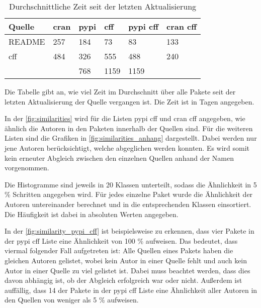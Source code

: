 \begin{table}
    \begin{tabularx}{\textwidth}{XR{1.3cm}R{1.3cm}R{1.3cm}R{2.4cm}R{2.6cm}}
        \toprule
        \textbf{Quelle} & \textbf{\gls{cran}} & \textbf{\gls{pypi}} & \textbf{\gls{cff}} & \textbf{\gls{pypi} \gls{cff}} & \textbf{\gls{cran} \gls{cff}} \\ 
        \midrule
        README          & 257 & 184 & 73   & 83   & 133 \\
        \gls{cff}       & 484 & 326 & 555  & 488  & 240 \\
         &     & 768 & 1159 & 1159 &     \\
        \bottomrule
    \end{tabularx}
    \caption{Durchschnittliche Zeit seit der letzten Aktualisierung}
    \label{tab:average_time_last_update}
    \small
    Die Tabelle gibt an, wie viel Zeit im Durchschnitt über alle Pakete seit der letzten Aktualisierung der Quelle vergangen ist. Die Zeit ist in Tagen angegeben.
\end{table}

In der \autoref{fig:similarities} wird für die Listen \gls{pypi} \gls{cff} und \gls{cran} \gls{cff} angegeben, wie ähnlich die Autoren in den Paketen innerhalb der Quellen sind.
Für die weiteren Listen sind die Grafiken in \autoref{fig:similarities_anhang} dargestellt.
Dabei werden nur jene Autoren berücksichtigt, welche abgeglichen werden konnten.
Es wird somit kein erneuter Abgleich zwischen den einzelnen Quellen anhand der Namen vorgenommen.

Die Histogramme sind jeweils in 20 Klassen unterteilt, sodass die Ähnlichkeit in 5 \% Schritten angegeben wird.
Für jedes einzelne Paket wurde die Ähnlichkeit der Autoren untereinander berechnet und in die entsprechenden Klassen einsortiert.
Die Häufigkeit ist dabei in absoluten Werten angegeben.

In der \autoref{fig:similarity_pypi_cff} ist beispielsweise zu erkennen, dass vier Pakete in der \gls{pypi} \gls{cff} Liste eine Ähnlichkeit von 100 \% aufweisen.
Das bedeutet, dass viermal folgender Fall aufgetreten ist: Alle Quellen eines Pakets haben die gleichen Autoren gelistet, wobei kein Autor in einer Quelle fehlt und auch kein Autor in einer Quelle zu viel gelistet ist.
Dabei muss beachtet werden, dass dies davon abhängig ist, ob der Abgleich erfolgreich war oder nicht.
Außerdem ist auffällig, dass 14 der Pakete in der \gls{pypi} \gls{cff} Liste eine Ähnlichkeit aller Autoren in den Quellen von weniger als 5 \% aufweisen.

